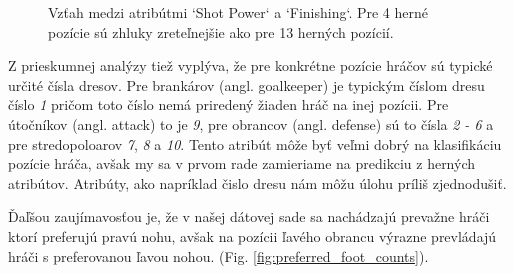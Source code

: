 \documentclass[runningheads]{llncs}
\begin{document}
\begin{figure}%
    \centering
    \qquad
    \caption{Vzťah medzi atribútmi `Shot Power` a `Finishing`. Pre 4 herné pozície sú zhluky zreteľnejšie ako pre 13 herných pozícií.}%
    \label{fig:shot_power_finishing_scatter_plot}%
\end{figure}

Z prieskumnej analýzy tiež vyplýva, že pre konkrétne pozície hráčov sú typické určité čísla dresov. Pre brankárov (angl. goalkeeper) je typickým číslom dresu číslo \textit{1} pričom toto číslo nemá priredený žiaden hráč na inej pozícii. Pre útočníkov (angl. attack) to je \textit{9}, pre obrancov (angl. defense) sú to čísla \textit{2 - 6} a pre stredopoloarov \textit{7}, \textit{8} a \textit{10}. Tento atribút môže byť veľmi dobrý na klasifikáciu pozície hráča, avšak my sa v prvom rade zamieriame na predikciu z herných atribútov. Atribúty, ako napríklad čislo dresu nám môžu úlohu príliš zjednodušiť.

Ďaľšou zaujímavosťou je, že v našej dátovej sade sa nachádzajú prevažne hráči ktorí preferujú pravú nohu, avšak na pozícii ľavého obrancu výrazne prevládajú hráči s preferovanou ľavou nohou. (Fig. \ref{fig:preferred_foot_counts}).
\end{document}
